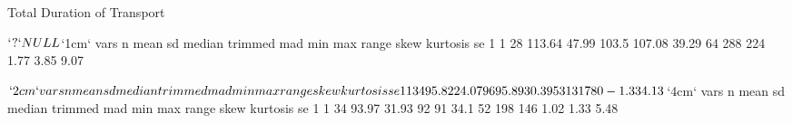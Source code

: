\documentclass{article}
\begin{document}
Total Duration of Transport
\begin{Schunk}
\begin{Soutput}
$`?`
NULL

$`1cm`
  vars  n   mean    sd median trimmed   mad min max range skew kurtosis   se
1    1 28 113.64 47.99  103.5  107.08 39.29  64 288   224 1.77     3.85 9.07

$`2cm`
  vars  n  mean    sd median trimmed   mad min max range skew kurtosis   se
1    1 34 95.82 24.07     96   95.89 30.39  53 131    78    0    -1.33 4.13

$`4cm`
  vars  n  mean    sd median trimmed  mad min max range skew kurtosis   se
1    1 34 93.97 31.93     92      91 34.1  52 198   146 1.02     1.33 5.48
\end{Soutput}
\end{Schunk}
\end{document}
